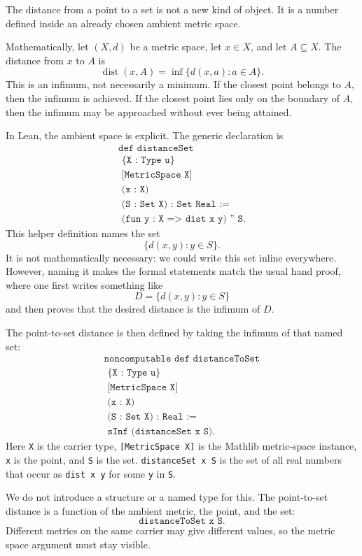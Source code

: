 \begin{remark*}
The distance from a point to a set is not a new kind of object. It is a number
defined inside an already chosen ambient metric space.

Mathematically, let $(X,d)$ be a metric space, let $x \in X$, and let
$A \subseteq X$. The distance from $x$ to $A$ is
\[
  \operatorname{dist}(x,A)
  =
  \inf \{ d(x,a) : a \in A \}.
\]
This is an infimum, not necessarily a minimum. If the closest point belongs to
$A$, then the infimum is achieved. If the closest point lies only on the
boundary of $A$, then the infimum may be approached without ever being attained.

In Lean, the ambient space is explicit. The generic declaration is
\[
\begin{gathered}
  \texttt{def distanceSet}\\
  \texttt{\ \ \ \ \{X : Type u\}}\\
  \texttt{\ \ \ \ [MetricSpace X]}\\
  \texttt{\ \ \ \ (x : X)}\\
  \texttt{\ \ \ \ (S : Set X) : Set Real :=}\\
  \texttt{\ \ (fun y : X => dist x y) '' S.}
\end{gathered}
\]
This helper definition names the set
\[
  \{ d(x,y) : y \in S \}.
\]
It is not mathematically necessary: we could write this set inline everywhere.
However, naming it makes the formal statements match the usual hand proof,
where one first writes something like
\[
  D = \{ d(x,y) : y \in S \}
\]
and then proves that the desired distance is the infimum of $D$.

The point-to-set distance is then defined by taking the infimum of that named
set:
\[
\begin{gathered}
  \texttt{noncomputable def distanceToSet}\\
  \texttt{\ \ \ \ \{X : Type u\}}\\
  \texttt{\ \ \ \ [MetricSpace X]}\\
  \texttt{\ \ \ \ (x : X)}\\
  \texttt{\ \ \ \ (S : Set X) : Real :=}\\
  \texttt{\ \ sInf (distanceSet x S).}
\end{gathered}
\]
Here \texttt{X} is the carrier type, \texttt{[MetricSpace X]} is the Mathlib
metric-space instance, \texttt{x} is the point, and \texttt{S} is the set.
\texttt{distanceSet x S} is the set of all real numbers that occur as
\texttt{dist x y} for some \texttt{y} in \texttt{S}.

We do not introduce a structure or a named type for this. The point-to-set
distance is a function of the ambient metric, the point, and the set:
\[
  \texttt{distanceToSet x S}.
\]
Different metrics on the same carrier may give different values, so the metric
space argument must stay visible.
\end{remark*}

